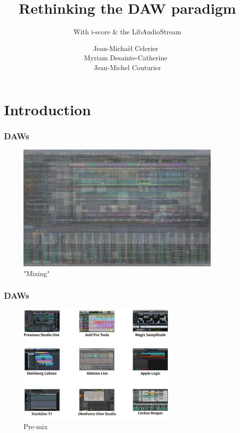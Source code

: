 \documentclass{beamer}
\title{Rethinking the DAW paradigm}
\subtitle{With i-score \& the LibAudioStream}
\date{}
\author{Jean-Michaël Celerier~\\ Myriam Desainte-Catherine~\\ Jean-Michel Couturier}
\institute{LaBRI, Blue Yeti}
\begin{document}
    
\maketitle
\begin{frame}
	\tableofcontents
\end{frame}
\section{Introduction}

\begin{frame}
    \frametitle{DAWs}    
    \Large
    \begin{figure}
        \centering
        \includegraphics[width=0.9\textwidth]{images/daws/together-flattened.png}
        \caption{"Mixing"}
    \end{figure}
\end{frame}

\begin{frame}
    \frametitle{DAWs}    
    \Large
    \begin{figure}
        \centering
        \includegraphics[width=0.7\textwidth]{images/daws/together-text.png}
        \caption{Pre-mix}
    \end{figure}
\end{frame}
\end{document}
